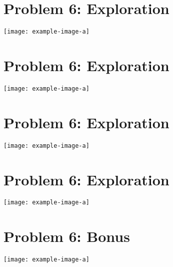 \documentclass{article}
\begin{document}
\section{Problem 6: Exploration}
\begin{answer}[title=Plot 1,height=9.5cm,width=\linewidth]
\centering
\texttt{[image: example-image-a]}
\end{answer}

\section{Problem 6: Exploration}
\begin{answer}[title=Plot 2,height=9.5cm,width=\linewidth]
\centering
\texttt{[image: example-image-a]}
\end{answer}

\section{Problem 6: Exploration}
\begin{answer}[title=Plot 3,height=9.5cm,width=\linewidth]
\centering
\texttt{[image: example-image-a]}
\end{answer}

\section{Problem 6: Exploration}
\begin{answer}[title=Plot 4,height=9.5cm,width=\linewidth]
\centering
\texttt{[image: example-image-a]}
\end{answer}

\section{Problem 6: Bonus}
\begin{answer}[title=Plot 4,height=9.5cm,width=\linewidth]
\centering
\texttt{[image: example-image-a]}
\end{answer}
\end{document}
